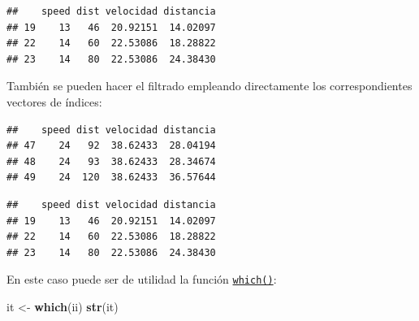 \documentclass[]{book}
\newenvironment{Shaded}{\begin{snugshade}}{\end{snugshade}}
\newcommand{\KeywordTok}[1]{\textcolor[rgb]{0.13,0.29,0.53}{\textbf{#1}}}
\newcommand{\DecValTok}[1]{\textcolor[rgb]{0.00,0.00,0.81}{#1}}
\newcommand{\StringTok}[1]{\textcolor[rgb]{0.31,0.60,0.02}{#1}}
\newcommand{\CommentTok}[1]{\textcolor[rgb]{0.56,0.35,0.01}{\textit{#1}}}
\newcommand{\OperatorTok}[1]{\textcolor[rgb]{0.81,0.36,0.00}{\textbf{#1}}}
\newcommand{\NormalTok}[1]{#1}
\begin{document}
\begin{verbatim}
##    speed dist velocidad distancia
## 19    13   46  20.92151  14.02097
## 22    14   60  22.53086  18.28822
## 23    14   80  22.53086  24.38430
\end{verbatim}

También se pueden hacer el filtrado empleando directamente los
correspondientes vectores de índices:

\begin{Shaded}
\end{Shaded}

\begin{verbatim}
##    speed dist velocidad distancia
## 47    24   92  38.62433  28.04194
## 48    24   93  38.62433  28.34674
## 49    24  120  38.62433  36.57644
\end{verbatim}

\begin{Shaded}
\end{Shaded}

\begin{verbatim}
##    speed dist velocidad distancia
## 19    13   46  20.92151  14.02097
## 22    14   60  22.53086  18.28822
## 23    14   80  22.53086  24.38430
\end{verbatim}

En este caso puede ser de utilidad la función
\href{https://www.rdocumentation.org/packages/base/versions/3.6.1/topics/which}{\texttt{which()}}:

\begin{Shaded}
\begin{Highlighting}[]
\NormalTok{it <-}\StringTok{ }\KeywordTok{which}\NormalTok{(ii)}
\KeywordTok{str}\NormalTok{(it)}
\end{Highlighting}
\end{Shaded}
\end{document}
